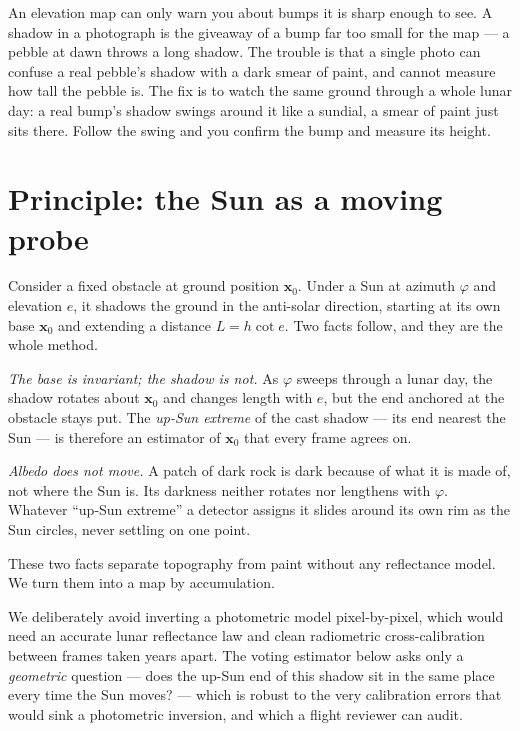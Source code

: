 \documentclass[11pt]{article}
\begin{document}
\begin{plainbox}
An elevation map can only warn you about bumps it is sharp enough to see. A shadow in a
photograph is the giveaway of a bump far too small for the map --- a pebble at dawn throws a
long shadow. The trouble is that a single photo can confuse a real pebble's shadow with a
dark smear of paint, and cannot measure how tall the pebble is. The fix is to watch the
same ground through a whole lunar day: a real bump's shadow swings around it like a sundial,
a smear of paint just sits there. Follow the swing and you confirm the bump and measure its
height.
\end{plainbox}

\section{Principle: the Sun as a moving probe}

Consider a fixed obstacle at ground position $\mathbf{x}_0$. Under a Sun at azimuth
$\varphi$ and elevation $e$, it shadows the ground in the anti-solar direction, starting at
its own base $\mathbf{x}_0$ and extending a distance $L=h\cot e$. Two facts follow, and they
are the whole method.

\emph{The base is invariant; the shadow is not.} As $\varphi$ sweeps through a lunar day,
the shadow rotates about $\mathbf{x}_0$ and changes length with $e$, but the end anchored at
the obstacle stays put. The \emph{up-Sun extreme} of the cast shadow --- its end nearest the
Sun --- is therefore an estimator of $\mathbf{x}_0$ that every frame agrees on.

\emph{Albedo does not move.} A patch of dark rock is dark because of what it is made of, not
where the Sun is. Its darkness neither rotates nor lengthens with $\varphi$. Whatever
``up-Sun extreme'' a detector assigns it slides around its own rim as the Sun circles, never
settling on one point.

These two facts separate topography from paint without any reflectance model. We turn them
into a map by accumulation.

\begin{intentbox}
We deliberately avoid inverting a photometric model pixel-by-pixel, which would need an
accurate lunar reflectance law \autocite{hapke1984,sato2014} and clean radiometric
cross-calibration between frames taken years apart. The voting estimator below asks only a
\emph{geometric} question --- does the up-Sun end of this shadow sit in the same place every
time the Sun moves? --- which is robust to the very calibration errors that would sink a
photometric inversion, and which a flight reviewer can audit.
\end{intentbox}
\end{document}
